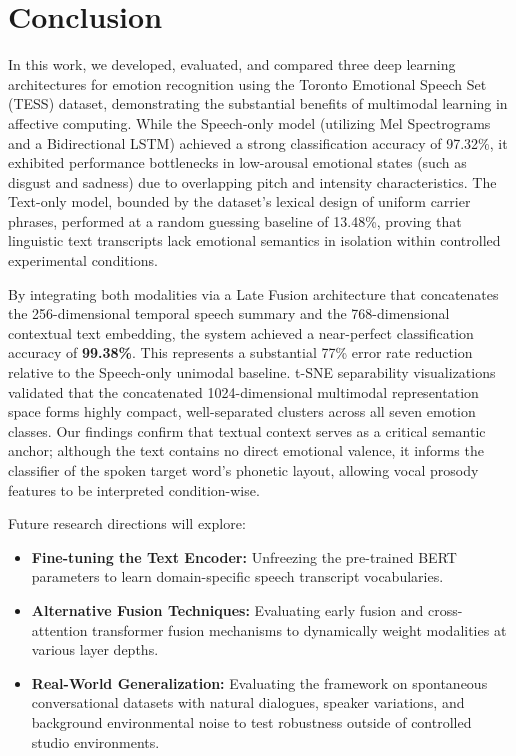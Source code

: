 \documentclass[11pt,journal,onecolumn]{IEEEtran}
\begin{document}
\newpage

\section{Conclusion}


In this work, we developed, evaluated, and compared three deep learning architectures for emotion recognition using the Toronto Emotional Speech Set (TESS) dataset, demonstrating the substantial benefits of multimodal learning in affective computing. While the Speech-only model (utilizing Mel Spectrograms and a Bidirectional LSTM) achieved a strong classification accuracy of 97.32\%, it exhibited performance bottlenecks in low-arousal emotional states (such as disgust and sadness) due to overlapping pitch and intensity characteristics. The Text-only model, bounded by the dataset's lexical design of uniform carrier phrases, performed at a random guessing baseline of 13.48\%, proving that linguistic text transcripts lack emotional semantics in isolation within controlled experimental conditions.

By integrating both modalities via a Late Fusion architecture that concatenates the 256-dimensional temporal speech summary and the 768-dimensional contextual text embedding, the system achieved a near-perfect classification accuracy of \textbf{99.38\%}. This represents a substantial 77\% error rate reduction relative to the Speech-only unimodal baseline. t-SNE separability visualizations validated that the concatenated 1024-dimensional multimodal representation space forms highly compact, well-separated clusters across all seven emotion classes. Our findings confirm that textual context serves as a critical semantic anchor; although the text contains no direct emotional valence, it informs the classifier of the spoken target word's phonetic layout, allowing vocal prosody features to be interpreted condition-wise.

Future research directions will explore:
\begin{itemize}
    \item \textbf{Fine-tuning the Text Encoder:} Unfreezing the pre-trained BERT parameters to learn domain-specific speech transcript vocabularies.
    \item \textbf{Alternative Fusion Techniques:} Evaluating early fusion and cross-attention transformer fusion mechanisms to dynamically weight modalities at various layer depths.
    \item \textbf{Real-World Generalization:} Evaluating the framework on spontaneous conversational datasets with natural dialogues, speaker variations, and background environmental noise to test robustness outside of controlled studio environments.
\end{itemize}
\end{document}
